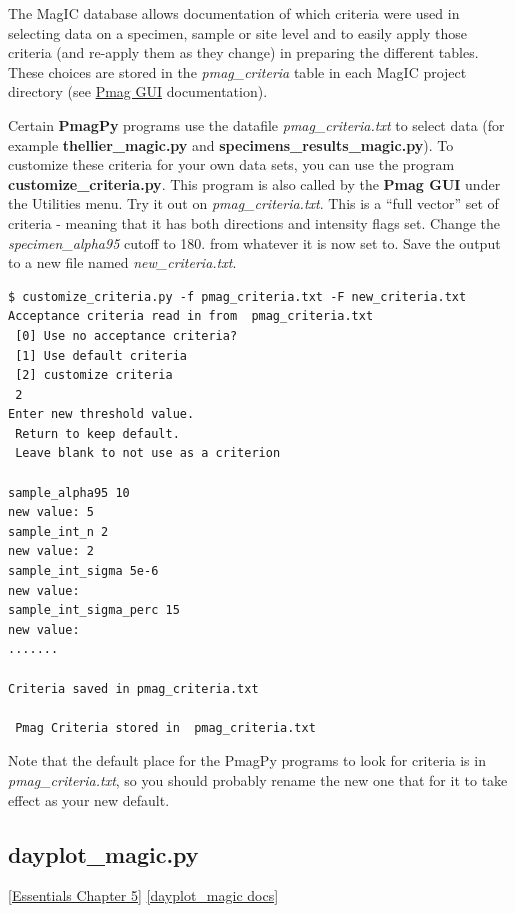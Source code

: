 \documentclass[11pt]{book}
\begin{document}
{{The MagIC database allows documentation of which criteria were used in selecting data on a specimen, sample or site level and to easily apply those criteria (and re-apply them as they change) in preparing the different tables.  These choices are stored in the {\it pmag\_criteria} table in each MagIC project directory (see \href{#pmag_gui.py}{Pmag GUI} documentation).

 Certain {\bf PmagPy} programs use the datafile {\it pmag\_criteria.txt} to select data (for example {\bf thellier\_magic.py} and {\bf specimens\_results\_magic.py}).  To customize these criteria for your own data sets, you can use the program {\bf customize\_criteria.py}.  This program is also called by the {\bf Pmag GUI} under the Utilities menu.    Try it out on {\it pmag\_criteria.txt}.   This is a ``full vector'' set of criteria - meaning that it has both directions and intensity flags set.  Change the {\it specimen\_alpha95} cutoff to 180. from whatever it is now set to.   Save the output to a new file named {\it new\_criteria.txt}.

\begin{verbatim}
$ customize_criteria.py -f pmag_criteria.txt -F new_criteria.txt
Acceptance criteria read in from  pmag_criteria.txt
 [0] Use no acceptance criteria?
 [1] Use default criteria
 [2] customize criteria
 2
Enter new threshold value.
 Return to keep default.
 Leave blank to not use as a criterion

sample_alpha95 10
new value: 5
sample_int_n 2
new value: 2
sample_int_sigma 5e-6
new value:
sample_int_sigma_perc 15
new value:
.......

Criteria saved in pmag_criteria.txt

 Pmag Criteria stored in  pmag_criteria.txt

\end{verbatim}

Note that the default place for the PmagPy programs to look for criteria is in {\it pmag\_criteria.txt}, so you should probably rename the new one that for it to take effect as your new default.

%

\subsection{dayplot\_magic.py}
\href{http://earthref.org/MAGIC/books/Tauxe/Essentials/WebBook3ch5.html#ch5}{[Essentials Chapter 5]}
\href{https://github.com/PmagPy/PmagPy/blob/master/programs/dayplot_magic.py}{[dayplot\_magic docs]}

}}
\end{document}
